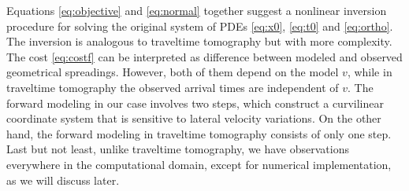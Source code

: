 Equations \ref{eq:objective} and \ref{eq:normal} together suggest a nonlinear inversion 
procedure for solving the original system of PDEs \ref{eq:x0}, \ref{eq:t0} and \ref{eq:ortho}. The inversion 
is analogous to traveltime tomography but with more complexity. The cost \ref{eq:costf} can be interpreted as 
difference between modeled and observed geometrical spreadings. However, both of them depend on the model $v$, 
while in traveltime tomography the observed arrival times are independent of $v$. The forward modeling in our case 
involves two steps, which construct a curvilinear coordinate system that is sensitive to lateral velocity 
variations. On the other hand, the forward modeling in traveltime tomography consists of only one step. Last but not least, unlike 
traveltime tomography, we have observations everywhere in the computational domain, except for  numerical implementation, as we will 
discuss later.

